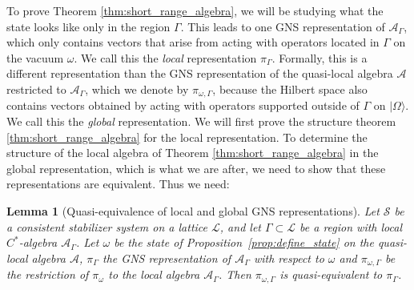 \documentclass[aps,pra,reprint,superscriptaddress]{revtex4-2}
\newcommand{\cA}{{\mathcal A}}
\newcommand{\cL}{{\mathcal L}}
\newcommand{\cS}{{\mathcal S}}
\newcommand\G{\Gamma}
\newcommand\w{\omega}
\newcommand\W{\Omega}
\providecommand{\ket}[1]{\lvert #1\rangle}
\newtheorem{lemma}[theorem]{Lemma}
\theoremstyle{definition}
\theoremstyle{remark}
\begin{document}
    To prove Theorem \ref{thm:short_range_algebra}, we will be studying what the state looks like only in the region $\G$. This leads to one GNS representation of $\cA_\G$, which only contains vectors that arise from acting with operators located in $\G$ on the vacuum $\w$. We call this the \emph{local} representation $\pi_\G$.
Formally, this is a different representation than the GNS representation of the quasi-local algebra $\cA$ restricted to $\cA_\G$, which we denote by $\pi_{\w,\G}$, because the Hilbert space also contains vectors obtained by acting with operators supported outside of $\G$ on $\ket{\W}$. We call this the \emph{global} representation.
We will first prove the structure theorem \ref{thm:short_range_algebra} for the local representation.
To determine the structure of the local algebra of Theorem \ref{thm:short_range_algebra} in the global representation, which is what we are after, we need to show that these representations are equivalent. Thus we need:
\begin{lemma}[Quasi-equivalence of local and global GNS representations]\label{lem:equivalence-local-global}
    Let $\cS$ be a consistent stabilizer system on a lattice $\cL$, and let $\G \subset \cL$ be a region with local $C^\ast$-algebra $\cA_\G$. Let $\w$ be the state of Proposition~\ref{prop:define_state} on the quasi-local algebra $\cA$, $\pi_\G$ the GNS representation of $\cA_\G$ with respect to $\w$ and $\pi_{\w,\G}$ be the restriction of $\pi_\w$ to the local algebra $\cA_\G$. Then $\pi_{\w,\G}$ is quasi-equivalent to $\pi_\G$.
\end{lemma}
    
\end{document}
